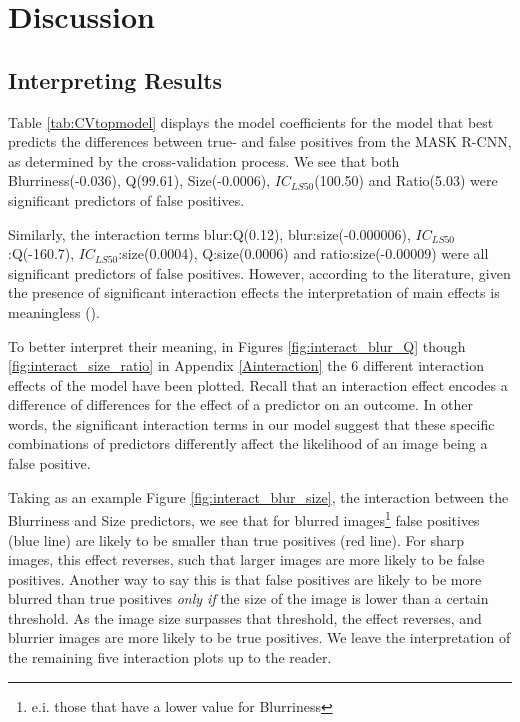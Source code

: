\documentclass[12pt]{article}
\begin{document}
\section{Discussion}
\subsection{Interpreting Results}\label{interpretres}
Table \ref{tab:CVtopmodel} displays the model coefficients for the model that best predicts the differences between true- and false positives from the MASK R-CNN, as determined by the cross-validation process. We see that both Blurriness(-0.036), Q(99.61), Size(-0.0006), $IC_{LS50}$(100.50) and Ratio(5.03) were significant predictors of false positives. 

Similarly, the interaction terms blur:Q(0.12), blur:size(-0.000006), $IC_{LS50}$:Q(-160.7), $IC_{LS50}$:size(0.0004), Q:size(0.0006) and ratio:size(-0.00009) were all significant predictors of false positives. However, according to the literature, given the presence of significant interaction effects the interpretation of main effects is meaningless (\cite{fieldDiscoveringStatisticsUsing2012}).

To better interpret their meaning, in Figures \ref{fig:interact_blur_Q} though \ref{fig:interact_size_ratio} in Appendix \ref{Ainteraction} the 6 different interaction effects of the model have been plotted. Recall that an interaction effect encodes a difference of differences for the effect of a predictor on an outcome. In other words, the significant interaction terms in our model suggest that these specific combinations of predictors differently affect the likelihood of an image being a false positive.

Taking as an example Figure \ref{fig:interact_blur_size}, the interaction between the Blurriness and Size predictors, we see that for blurred images\footnote{e.i. those that have a lower value for Blurriness} false positives (blue line) are likely to be smaller than true positives (red line). For sharp images, this effect reverses, such that larger images are more likely to be false positives. 
Another way to say this is that false positives are likely to be more blurred than true positives \textit{only if} the size of the image is lower than a certain threshold. As the image size surpasses that threshold, the effect reverses, and blurrier images are more likely to be true positives. We leave the interpretation of the remaining five interaction plots up to the reader.
\end{document}
